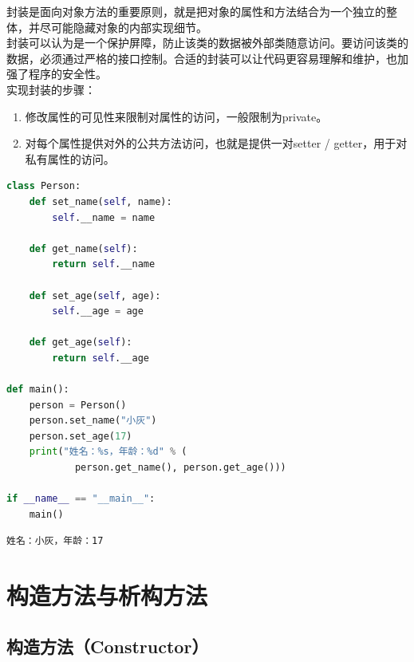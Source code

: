 封装是面向对象方法的重要原则，就是把对象的属性和方法结合为一个独立的整体，并尽可能隐藏对象的内部实现细节。\\

封装可以认为是一个保护屏障，防止该类的数据被外部类随意访问。要访问该类的数据，必须通过严格的接口控制。合适的封装可以让代码更容易理解和维护，也加强了程序的安全性。\\

实现封装的步骤：

\begin{enumerate}
	\item 修改属性的可见性来限制对属性的访问，一般限制为private。
	\item 对每个属性提供对外的公共方法访问，也就是提供一对setter / getter，用于对私有属性的访问。
\end{enumerate}

\vspace{0.5cm}


\begin{lstlisting}[language=Python]
class Person:
    def set_name(self, name):
        self.__name = name
    
    def get_name(self):
        return self.__name
    
    def set_age(self, age):
        self.__age = age
    
    def get_age(self):
        return self.__age

def main():
    person = Person()
    person.set_name("小灰")
    person.set_age(17)
    print("姓名：%s，年龄：%d" % (
            person.get_name(), person.get_age()))

if __name__ == "__main__":
    main()
\end{lstlisting}

\begin{tcolorbox}
	\begin{verbatim}
姓名：小灰，年龄：17
\end{verbatim}
\end{tcolorbox}

\newpage

\section{构造方法与析构方法}

\subsection{构造方法（Constructor）}

